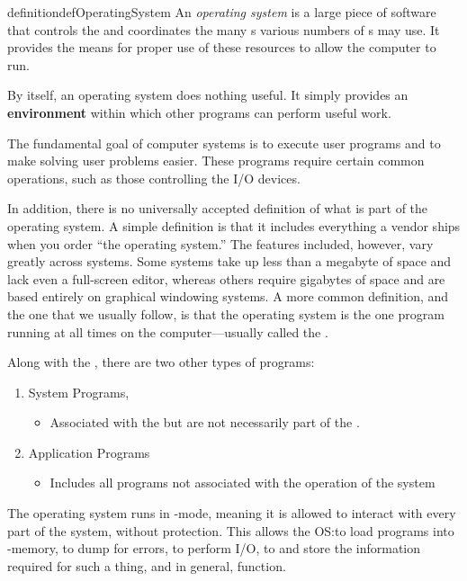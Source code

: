 \begin{restatable}{definition}{defOperatingSystem}\label{def:Operating_System}
  An \emph{operating system} is a large piece of software that controls the  and coordinates the many s various numbers of s may use.
  It provides the means for proper use of these resources to allow the computer to run.

  By itself, an operating system does nothing useful.
  It simply provides an \textbf{environment} within which other programs can perform useful work.

  The fundamental goal of computer systems is to execute user programs and to make solving user problems easier.
  These programs require certain common operations, such as those controlling the I/O devices.

  In addition, there is no universally accepted definition of what is part of the operating system.
  A simple definition is that it includes everything a vendor ships when you order ``the operating system.''
  The features included, however, vary greatly across systems.
  Some systems take up less than a megabyte of space and lack even a full-screen editor, whereas others require gigabytes of space and are based entirely on graphical windowing systems.
  A more common definition, and the one that we usually follow, is that the operating system is the one program running at all times on the computer—usually called the .

  \begin{remark}\label{rmk:Kernel_Level_Non_Kernel_Programs}
    Along with the , there are two other types of programs:
    \begin{enumerate}[noitemsep]
    \item System Programs,
      \begin{itemize}[noitemsep]
      \item Associated with the  but are not necessarily part of the .
      \end{itemize}
    \item Application Programs
      \begin{itemize}[noitemsep]
      \item Includes all programs not associated with the operation of the system
      \end{itemize}
    \end{enumerate}
  \end{remark}

  The operating system runs in -mode, meaning it is allowed to interact with every part of the system, without protection.
  This allows the OS:\@ to load  programs into -memory, to dump for errors, to perform I/O, to  and store the information required for such a thing, and in general, function.
\end{restatable}

